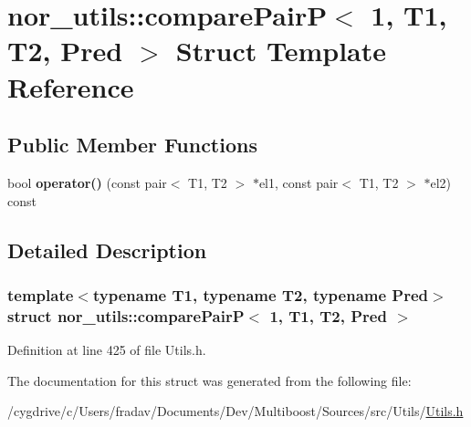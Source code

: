 \hypertarget{structnor__utils_1_1comparePairP_3_011_00_01T1_00_01T2_00_01Pred_01_4}{
\section{nor\_\-utils::comparePairP$<$ 1, T1, T2, Pred $>$ Struct Template Reference}
\label{structnor__utils_1_1comparePairP_3_011_00_01T1_00_01T2_00_01Pred_01_4}
}
\subsection*{Public Member Functions}
\begin{DoxyCompactItemize}
\item 
\hypertarget{structnor__utils_1_1comparePairP_3_011_00_01T1_00_01T2_00_01Pred_01_4_a5ff5066adb6395d0858c616b3622cc6c}{
bool {\bfseries operator()} (const pair$<$ T1, T2 $>$ $\ast$el1, const pair$<$ T1, T2 $>$ $\ast$el2) const }
\label{structnor__utils_1_1comparePairP_3_011_00_01T1_00_01T2_00_01Pred_01_4_a5ff5066adb6395d0858c616b3622cc6c}

\end{DoxyCompactItemize}


\subsection{Detailed Description}
\subsubsection*{template$<$typename T1, typename T2, typename Pred$>$struct nor\_\-utils::comparePairP$<$ 1, T1, T2, Pred $>$}



Definition at line 425 of file Utils.h.



The documentation for this struct was generated from the following file:\begin{DoxyCompactItemize}
\item 
/cygdrive/c/Users/fradav/Documents/Dev/Multiboost/Sources/src/Utils/\hyperlink{Utils_8h}{Utils.h}\end{DoxyCompactItemize}
